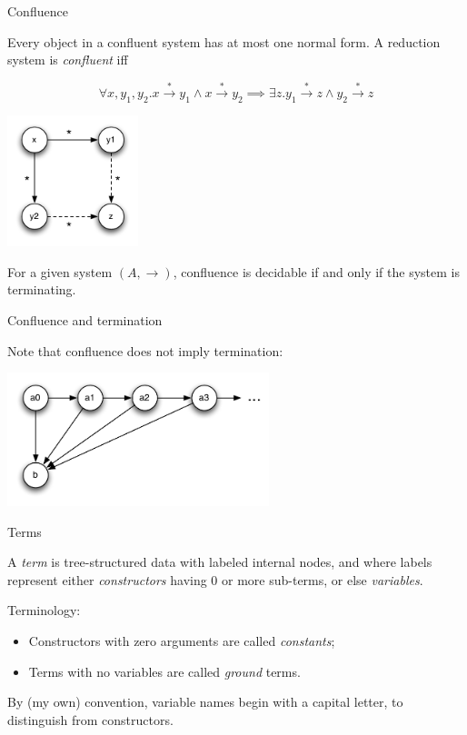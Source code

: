 \documentclass{beamer}
\begin{document}
\begin{frame}{Confluence}

Every object in a confluent system has at most one normal form. A reduction
system is \emph{confluent} iff

\[
\forall x,y_1,y_2 . 
x \xrightarrow{*} y_1 \land x \xrightarrow{*} y_2 \implies 
\exists z . y_1 \xrightarrow{*} z \land y_2 \xrightarrow{*} z
\]

\begin{center}
\includegraphics[width=1.5in]{images/confluence}
\end{center}

For a given system $(A,\to)$, confluence is decidable if and only if the
system is terminating.

\end{frame}


\begin{frame}{Confluence and termination}

Note that confluence does not imply termination:

\begin{center}
\includegraphics[width=3in]{images/ars}
\end{center}

\end{frame}


\begin{frame}{Terms}

A \emph{term} is tree-structured data with labeled internal nodes, and where
labels represent either \emph{constructors} having 0 or more sub-terms, or
else \emph{variables}.

Terminology:

\begin{itemize}
  \item Constructors with zero arguments are called \emph{constants};
  \item Terms with no variables are called \emph{ground} terms.
\end{itemize}

By (my own) convention, variable names begin with a capital letter, to
distinguish from constructors.

\end{frame}
\end{document}
